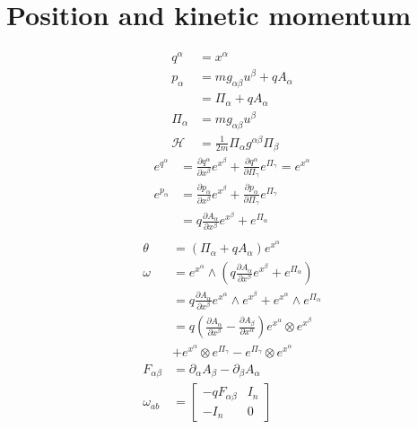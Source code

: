 \documentclass[11pt]{article}
\begin{document}
\section{Position and kinetic momentum}
\begin{equation}
\begin{aligned}
	q^\alpha &= x^\alpha \\
	p_\alpha &= m g_{\alpha \beta} u^\beta + q A_\alpha \\
	&= \Pi_\alpha + q A_\alpha \\
	\Pi_\alpha &= m g_{\alpha \beta} u^\beta \\
	\mathcal{H} &= \frac{1}{2m} \Pi_\alpha g^{\alpha\beta} \Pi_\beta 
\end{aligned}
\end{equation}
\begin{equation}
\begin{aligned}
	e^{q^\alpha} &= \frac{\partial q^\alpha}{\partial x^\beta}e^{x^\beta} + \frac{\partial q^\alpha}{\partial \Pi_\gamma}e^{\Pi_\gamma} = e^{x^\alpha} \\
	e^{p_\alpha} &= \frac{\partial p_\alpha}{\partial x^\beta}e^{x^\beta} + \frac{\partial p_\alpha}{\partial \Pi_\gamma}e^{\Pi_\gamma} \\
	&= q \frac{\partial A_\alpha}{\partial x^\beta} e^{x^\beta} +e^{\Pi_\alpha} \\
\end{aligned}
\end{equation}
\begin{equation}
\begin{aligned}
	\theta &= (\Pi_\alpha + q A_\alpha) e^{x^\alpha} \\
	\omega &= e^{x^\alpha} \wedge \left( q \frac{\partial A_\alpha}{\partial x^\beta} e^{x^\beta} +e^{\Pi_\alpha} \right) \\
	&= q \frac{\partial A_\alpha}{\partial x^\beta} e^{x^\alpha} \wedge e^{x^\beta} + e^{x^\alpha} \wedge e^{\Pi_\alpha} \\
	&=  q \left( \frac{\partial A_\alpha}{\partial x^\beta} - \frac{\partial A_\beta}{\partial x^\alpha}\right)  e^{x^\alpha} \otimes e^{x^\beta} \\
	&+ e^{x^\alpha} \otimes e^{\Pi_\gamma} - e^{\Pi_\gamma} \otimes e^{x^\alpha} \\
	F_{\alpha\beta} &= \partial_\alpha A_\beta - \partial_\beta A_\alpha \\
	\omega_{ab} &= \left[ \begin{matrix}
		- q F_{\alpha\beta} & I_n \\[2.2ex]
		- I_n & 0 \end{matrix} \right] \\
\end{aligned}
\end{equation}
\end{document}
